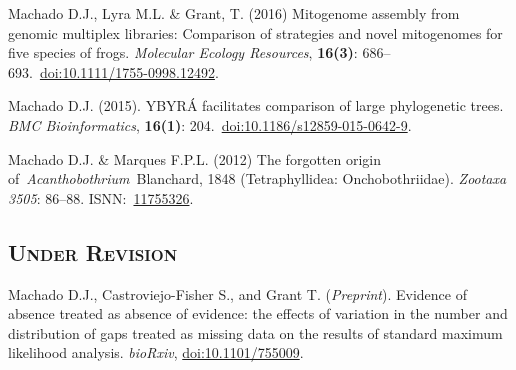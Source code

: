 {\begin{hangparas}{.25in}{1}
		Machado D.J., Lyra M.L. \& Grant, T. (2016) Mitogenome assembly from genomic multiplex libraries: Comparison of strategies and novel mitogenomes for five species of frogs. \emph{Molecular Ecology Resources}, \textbf{16(3)}: 686--693.~\href{https://doi.org/10.1111/1755-0998.12492}{doi:10.1111/1755-0998.12492}.

		Machado D.J. (2015). YBYRÁ facilitates comparison of large phylogenetic trees. \emph{BMC Bioinformatics}, \textbf{16(1)}: 204.~\href{https://doi.org/10.1186/s12859-015-0642-9}{doi:10.1186/s12859-015-0642-9}.

		Machado D.J. \& Marques F.P.L. (2012) The forgotten origin of~\emph{Acanthobothrium}~Blanchard, 1848 (Tetraphyllidea: Onchobothriidae). \emph{Zootaxa} \emph{3505}: 86--88. ISNN:~\href{http://www.mapress.com/zootaxa/2012/f/z03505p088f.pdf}{11755326}.

		\end{hangparas}
	}

\subsection{\textsc{Under Revision}}

	{
	\setlength{\parskip}{.5em}\renewcommand{\baselinestretch}{2.0}
	\begin{hangparas}{.25in}{1}
			
		Machado D.J., Castroviejo-Fisher S., and Grant T. (\emph{Preprint}). Evidence of absence treated as absence of evidence: the effects of variation in the number and distribution of gaps treated as missing data on the results of standard maximum likelihood analysis. \emph{bioRxiv}, \href{https://doi.org/10.1101/755009}{doi:10.1101/755009}.
			
	\end{hangparas}
}
